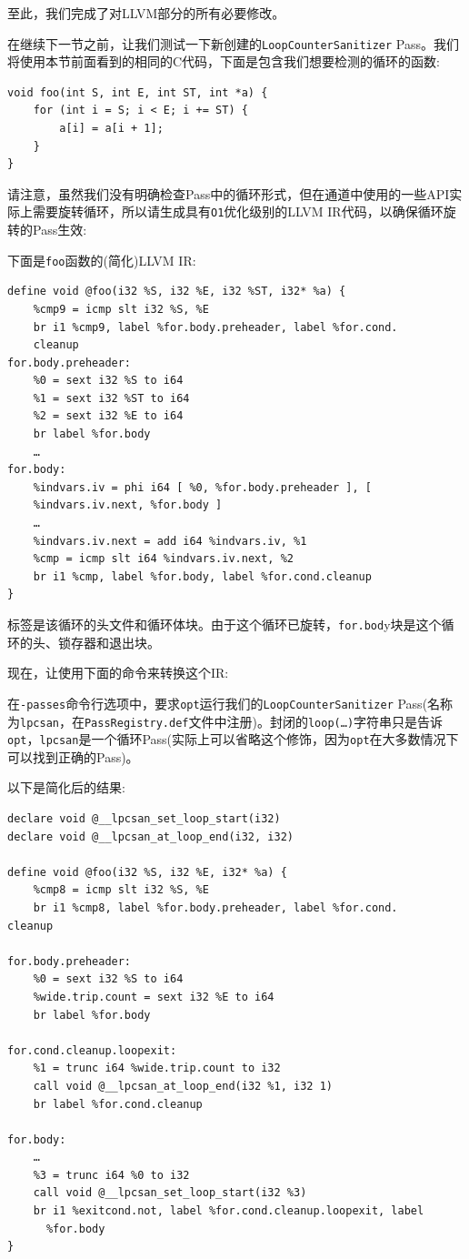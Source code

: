 至此，我们完成了对LLVM部分的所有必要修改。

在继续下一节之前，让我们测试一下新创建的\texttt{LoopCounterSanitizer} Pass。我们将使用本节前面看到的相同的C代码，下面是包含我们想要检测的循环的函数:

\begin{lstlisting}[style=styleCXX]
void foo(int S, int E, int ST, int *a) {
	for (int i = S; i < E; i += ST) {
		a[i] = a[i + 1];
	}
}
\end{lstlisting}

请注意，虽然我们没有明确检查Pass中的循环形式，但在通道中使用的一些API实际上需要旋转循环，所以请生成具有\texttt{O1}优化级别的LLVM IR代码，以确保循环旋转的Pass生效:

下面是\texttt{foo}函数的(简化)LLVM IR:

\begin{lstlisting}[style=styleCXX]
define void @foo(i32 %S, i32 %E, i32 %ST, i32* %a) {
	%cmp9 = icmp slt i32 %S, %E
	br i1 %cmp9, label %for.body.preheader, label %for.cond.
	cleanup
for.body.preheader:
	%0 = sext i32 %S to i64
	%1 = sext i32 %ST to i64
	%2 = sext i32 %E to i64
	br label %for.body
	…
for.body:
	%indvars.iv = phi i64 [ %0, %for.body.preheader ], [
	%indvars.iv.next, %for.body ]
	…
	%indvars.iv.next = add i64 %indvars.iv, %1
	%cmp = icmp slt i64 %indvars.iv.next, %2
	br i1 %cmp, label %for.body, label %for.cond.cleanup
}
\end{lstlisting}

标签是该循环的头文件和循环体块。由于这个循环已旋转，\texttt{for.bod}y块是这个循环的头、锁存器和退出块。

现在，让使用下面的命令来转换这个IR:


在\texttt{-passes}命令行选项中，要求\texttt{opt}运行我们的\texttt{LoopCounterSanitizer} Pass(名称为\texttt{lpcsan}，在\texttt{PassRegistry.def}文件中注册)。封闭的\texttt{loop(…)}字符串只是告诉\texttt{opt}，\texttt{lpcsan}是一个循环Pass(实际上可以省略这个修饰，因为\texttt{opt}在大多数情况下可以找到正确的Pass)。

以下是简化后的结果:

\begin{lstlisting}[style=styleCXX]
declare void @__lpcsan_set_loop_start(i32)
declare void @__lpcsan_at_loop_end(i32, i32)

define void @foo(i32 %S, i32 %E, i32* %a) {
	%cmp8 = icmp slt i32 %S, %E
	br i1 %cmp8, label %for.body.preheader, label %for.cond.
cleanup
	
for.body.preheader:
	%0 = sext i32 %S to i64
	%wide.trip.count = sext i32 %E to i64
	br label %for.body
	
for.cond.cleanup.loopexit:
	%1 = trunc i64 %wide.trip.count to i32
	call void @__lpcsan_at_loop_end(i32 %1, i32 1)
	br label %for.cond.cleanup
	
for.body:
	…
	%3 = trunc i64 %0 to i32
	call void @__lpcsan_set_loop_start(i32 %3)
	br i1 %exitcond.not, label %for.cond.cleanup.loopexit, label
	  %for.body
}
\end{lstlisting}

